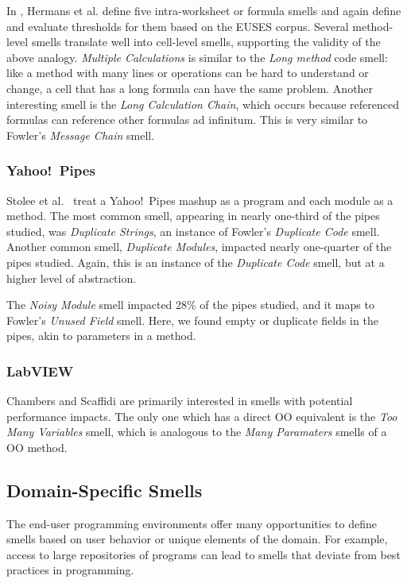 \documentclass[10pt,conference,compsocconf]{IEEEtran}
\begin{document}
In \cite{Hermans2012intra}, Hermans et al. define five intra-worksheet or formula smells and again define and evaluate thresholds for them based on the EUSES corpus.
Several method-level smells translate well into cell-level smells, supporting the validity of the above analogy.
\textit{Multiple Calculations} is similar to the \textit{Long method} code smell: like a method with many lines or operations can be hard to understand or change, a cell that has a long formula can have the same problem.
Another interesting smell is the \textit{Long Calculation Chain}, which occurs because referenced formulas can reference other formulas ad infinitum.
This is very similar to Fowler's \textit{Message Chain} smell.

\subsubsection{Yahoo!\ Pipes}
Stolee et al.~\cite{Stolee2011, StoleeTSE2013} treat a Yahoo!\ Pipes mashup as a program and each module as a method.  The most common smell, appearing in nearly one-third of the pipes studied, was \emph{Duplicate Strings}, an instance of Fowler's \emph{Duplicate Code} smell. 
Another common smell, \emph{Duplicate Modules}, impacted nearly one-quarter of the pipes studied. Again, this is an instance of the \emph{Duplicate Code} smell, but at a higher level of abstraction. 

The \emph{Noisy Module} smell impacted 28\% of the pipes studied, and it maps to Fowler's \emph{Unused Field} smell. Here, we found empty or duplicate fields in the pipes, akin to parameters in a method. 

\subsubsection{LabVIEW}

Chambers and Scaffidi \cite{chambers2013smell} are primarily interested in smells with potential performance impacts. The only one which has a direct OO equivalent is the \emph{Too Many Variables} smell, which is analogous to the \emph{Many Paramaters} smells of a OO method.

\subsection{Domain-Specific Smells}
The end-user programming environments offer many opportunities to define smells based on user behavior or unique elements of the domain. For example, access to large repositories of programs can lead to smells that deviate from best practices in programming.
\end{document}

